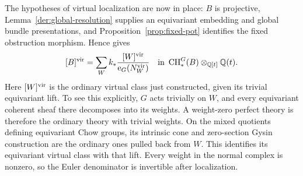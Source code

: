 The hypotheses of virtual localization are now in place: $B$ is
projective, Lemma~\ref{der:global-resolution} supplies an equivariant
embedding and global bundle presentations, and
Proposition~\ref{prop:fixed-pot} identifies the fixed obstruction
morphism.  Hence \cite[Section~3]{GP} gives
\begin{equation}\label{der:localization}
[B]^{\mathrm{vir}}=\sum_W k_*\frac{[W]^{\mathrm{vir}}}{\operatorname{e}_G(N_W^{\mathrm{vir}})}
\quad\hbox{in }\operatorname{CH}_*^G(B)\otimes_{\mathbb Q[t]}\mathbb Q(t).
\end{equation}
Here $[W]^{\mathrm{vir}}$ is the ordinary virtual class just constructed, given
its trivial equivariant lift.  To see this explicitly, $G$ acts trivially
on $W$, and every equivariant coherent sheaf there decomposes into its
weights.  A weight-zero perfect theory is therefore the ordinary theory
with trivial weights.  On the mixed quotients defining equivariant Chow
groups, its intrinsic cone and zero-section Gysin construction are the
ordinary ones pulled back from $W$.  This identifies its equivariant
virtual class with that lift.  Every weight in the normal complex is
nonzero, so the Euler denominator is invertible after localization.
